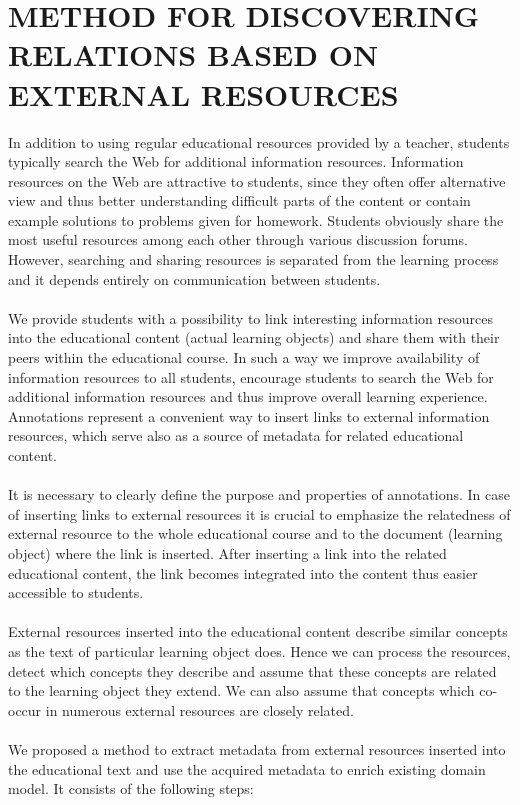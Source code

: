 \documentclass{llncs}
\begin{document}
\section{METHOD FOR DISCOVERING RELATIONS BASED ON EXTERNAL RESOURCES}
%  
In addition to using regular educational resources provided by a teacher, students typically search the Web for additional information resources. Information resources on the Web are attractive to students, since they often offer alternative view and thus better understanding difficult parts of the content or contain example solutions to problems given for homework. Students obviously share the most useful resources among each other through various discussion forums. However, searching and sharing resources is separated from the learning process and it depends entirely on communication between students.\\
\\
We provide students with a possibility to link interesting information resources into the educational content (actual learning objects) and share them with their peers within the educational course. In such a way we improve availability of information resources to all students, encourage students to search the Web for additional information resources and thus improve overall learning experience. Annotations represent a convenient way to insert links to external information resources, which serve also as a source of metadata for related educational content.\\
\\
It is necessary to clearly define the purpose and properties of annotations. In case of inserting links to external resources it is crucial to emphasize the relatedness of external resource to the whole educational course and to the document (learning object) where the link is inserted. After inserting a link into the related educational content, the link becomes integrated into the content thus easier accessible to students.\\
\\
External resources inserted into the educational content describe similar concepts as the text of particular learning object does. Hence we can process the resources, detect which concepts they describe and assume that these concepts are related to the learning object they extend. We can also assume that concepts which co-occur in numerous external resources are closely related.\\
\\
We proposed a method to extract metadata from external resources inserted into the educational text and use the acquired metadata to enrich existing domain model. It consists of the following steps:
\end{document}
